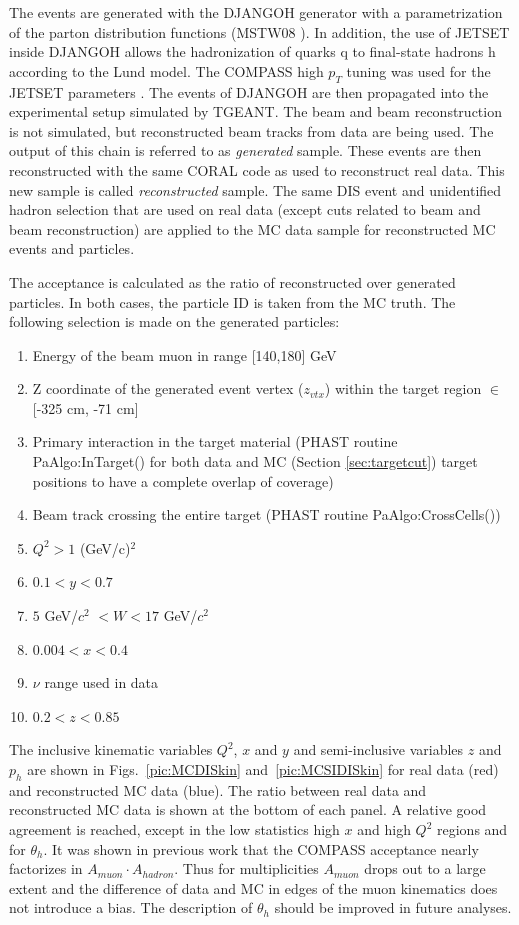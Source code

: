 The events are generated with the DJANGOH generator with a parametrization of the parton distribution functions (MSTW08 \cite{MSTW08}). In addition, the use of JETSET inside DJANGOH allows the hadronization of quarks q to final-state hadrons h according to the Lund model. The COMPASS high $p_T$ tuning was used for the JETSET parameters \cite{PTTuning}. The events of DJANGOH are then propagated into the experimental setup simulated by TGEANT. The beam and beam reconstruction is not simulated, but reconstructed beam tracks from data are being used. The output of this chain is referred to as \textit{generated} sample. These events are then reconstructed with the same CORAL code as used to reconstruct real data. This new sample is called \textit{reconstructed} sample. The same DIS event and unidentified hadron selection that are used on real data (except cuts related to beam and beam reconstruction) are applied to the MC data sample for reconstructed MC events and particles.

The acceptance is calculated as the ratio of reconstructed over generated particles. In both cases, the particle ID is taken from the MC truth. The following selection is made on the generated particles:

\begin{enumerate}
  \item Energy of the beam muon in range [140,180] GeV
	\item Z coordinate of the generated event vertex ($z_{vtx}$) within the target region $\in$ [-325 cm, -71 cm]
	\item Primary interaction in the target material (PHAST routine PaAlgo:InTarget() for both data and MC (Section \ref{sec:targetcut}) target positions to have a complete overlap of coverage)
	\item Beam track crossing the entire target (PHAST routine PaAlgo:CrossCells())
  \item $Q^2>1$ (GeV/c)$^2$
  \item $0.1 < y < 0.7$
	\item $5$ GeV/$c^2$ $< W < 17$ GeV/$c^2$
  \item $0.004 < x < 0.4$
  \item $\nu$ range used in data
  \item $0.2 < z < 0.85$
\end{enumerate}

The inclusive kinematic variables $Q^2$, $x$ and $y$ and semi-inclusive variables $z$ and $p_h$ are shown in Figs.~\ref{pic:MCDISkin} and~\ref{pic:MCSIDISkin} for real data (red) and reconstructed MC data (blue). The ratio between real data and reconstructed MC data is shown at the bottom of each panel. A relative good agreement is reached, except in the low statistics high $x$ and high $Q^2$ regions and for $\theta_h$. It was shown in previous work that the COMPASS acceptance nearly factorizes in $A_{muon} \cdot A_{hadron}$. Thus for multiplicities $A_{muon}$ drops out to a large extent and the difference of data and MC in edges of the muon kinematics does not introduce a bias. The description of $\theta_h$ should be improved in future analyses.

